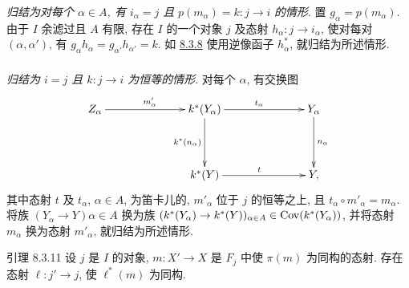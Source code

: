 \subsubsection{}

\emph{归结为对每个 $\alpha\in A$, 有 $i_\alpha=j$ 且}
$p(m_\alpha)=k:j\to i$ \emph{的情形}.
置 $g_\alpha=p(m_\alpha)$.
由于 $I$ 余滤过且 $A$ 有限,
存在 $I$ 的一个对象 $j$ 及态射 $h_\alpha:j\to i_\alpha$,
使对每对 $(\alpha,\alpha')$,
有 $g_\alpha h_\alpha=g_{\alpha'}h_{\alpha'}=k$.
如 \hyperref[VI.subsubsec8.3.8]{8.3.8}
使用逆像函子 $h_\alpha^{\ast}$, 就归结为所述情形.

\subsubsection{}

\emph{归结为 $i=j$ 且 $k:j\to i$ 为恒等的情形}.
对每个 $\alpha$, 有交换图
\[
\xymatrix@C=2.5cm@R=1.5cm{
Z_{\alpha}  \ar[r]^{m'_\alpha} &  k^{\ast}(Y_{\alpha}) \ar[d]_{k^{\ast}(n_{\alpha})}
\ar[r]^{t_{\alpha}} & Y_{\alpha} \ar[d]^{n_{\alpha}}\\
                    & k^{\ast}(Y)  \ar[r]^{t} & Y,
}
\]
其中态射 $t$ 及 $t_\alpha$, $\alpha\in A$, 为笛卡儿的,
$m'_\alpha$ 位于 $j$ 的恒等之上,
且 $t_\alpha\circ m'_\alpha=m_\alpha$.
将族 $(Y_\alpha\to Y)\alpha\in A$
换为\pageoriginale{}族
$(k^{\ast}(Y_\alpha)\to k^{\ast}(Y))_{\alpha\in A}\in
\Cov(k^{\ast}(Y_\alpha))$,
并将态射 $m_\alpha$ 换为态射 $m'_\alpha$,
就归结为所述情形.

\begin{enonce*}{引理 8.3.11}
设 $j$ 是 $I$ 的对象,
$m:X'\to X$ 是 $F_j$ 中使 $\pi(m)$ 为同构的态射.
存在态射 $\ell:j'\to j$,
使 $\ell^{\ast}(m)$ 为同构.
\end{enonce*}

